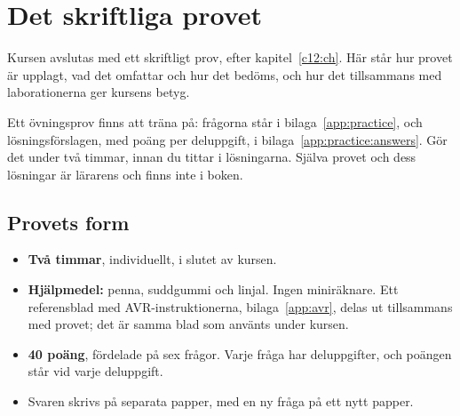 %

\chapter{Det skriftliga provet}
\label{app:exam}

Kursen avslutas med ett skriftligt prov, efter kapitel~\ref{c12:ch}. Här står hur provet är upplagt,
vad det omfattar och hur det bedöms, och hur det tillsammans med laborationerna ger kursens betyg.

Ett övningsprov finns att träna på: frågorna står i bilaga~\ref{app:practice}, och
lösningsförslagen, med poäng per deluppgift, i bilaga~\ref{app:practice:answers}. Gör det under två
timmar, innan du tittar i lösningarna. Själva provet och dess lösningar är lärarens och finns inte
i boken.

\section*{Provets form}
\begin{itemize}
  \item \textbf{Två timmar}, individuellt, i slutet av kursen.
  \item \textbf{Hjälpmedel:} penna, suddgummi och linjal. Ingen miniräknare. Ett referensblad med
    AVR-instruktionerna, bilaga~\ref{app:avr}, delas ut tillsammans med provet; det är samma blad
    som använts under kursen.
  \item \textbf{40 poäng}, fördelade på sex frågor. Varje fråga har deluppgifter, och poängen står
    vid varje deluppgift.
  \item Svaren skrivs på separata papper, med en ny fråga på ett nytt papper.
\end{itemize}

